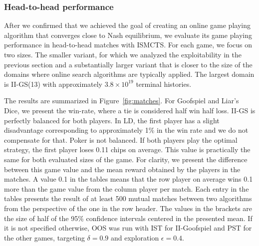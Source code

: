 \documentclass{aamas2015}
\newcounter{mlNoteCounter}
\newcommand{\mlnote}[1]{{\scriptsize \color{darkgreen} $\blacksquare$ \refstepcounter{mlNoteCounter}\textsf{[ML]$_{\arabic{mlNoteCounter}}$:{#1}}}}
\renewcommand{\mlnote}[1]{}
\begin{document}

\subsubsection{Head-to-head performance}

After we confirmed that we achieved the goal of creating an online game playing algorithm that converges close to Nash equilibrium, we evaluate its game playing performance in head-to-head matches with ISMCTS.
For each game, we focus on two sizes. The smaller variant, for which we analyzed the exploitability in the previous section and a substantially larger variant that is closer to the size of the domains where online search algorithms are typically applied.
The largest domain is II-GS(13) with approximately $3.8\times10^{19}$ terminal histories.



The results are summarized in Figure~\ref{fig:matches}.
For Goofspiel and Liar's Dice, we present the win-rate, where a tie is considered half win half loss. II-GS is perfectly balanced for both players. In LD, the first player has a slight disadvantage corresponding to approximately 1\% \mlnote{...?} in the win rate and we do not compensate for that.
Poker is not balanced. If both players play the optimal strategy, the first player loses 0.11 chips on average.
This value is practically the same for both evaluated sizes of the game.
For clarity, we present the difference between this game value and the mean reward obtained by the players in the matches. A value 0.1 in the tables means that the row player on average wins 0.1 more than the game value from the column player per match.
Each entry in the tables presents the result of at least 500 mutual matches between two algorithms from the perspective of the one in the row header. The values in the brackets are the size of half of the 95\% confidence intervals centered in the presented mean. If it is not specified otherwise, OOS was run with IST for II-Goofspiel and PST for the other games, targeting $\delta=0.9$ and exploration $\epsilon=0.4$.
\end{document}
